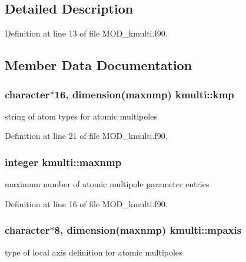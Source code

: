 \subsection{Detailed Description}


Definition at line 13 of file M\-O\-D\-\_\-kmulti.\-f90.



\subsection{Member Data Documentation}
\hypertarget{classkmulti_aab33216080234dbed3e2a25133cfa470}{
\subsubsection[{kmp}]{\setlength{\rightskip}{0pt plus 5cm}character$\ast$16, dimension({\bf maxnmp}) kmulti\-::kmp}}\label{classkmulti_aab33216080234dbed3e2a25133cfa470}


string of atom types for atomic multipoles 



Definition at line 21 of file M\-O\-D\-\_\-kmulti.\-f90.

\hypertarget{classkmulti_ab7a2af780bd3530132eb0739eed19b48}{
\subsubsection[{maxnmp}]{\setlength{\rightskip}{0pt plus 5cm}integer kmulti\-::maxnmp}}\label{classkmulti_ab7a2af780bd3530132eb0739eed19b48}


maximum number of atomic multipole parameter entries 



Definition at line 16 of file M\-O\-D\-\_\-kmulti.\-f90.

\hypertarget{classkmulti_a1c8196d3d05fe66d16f34b7ccb986e55}{
\subsubsection[{mpaxis}]{\setlength{\rightskip}{0pt plus 5cm}character$\ast$8, dimension({\bf maxnmp}) kmulti\-::mpaxis}}\label{classkmulti_a1c8196d3d05fe66d16f34b7ccb986e55}


type of local axis definition for atomic multipoles 



